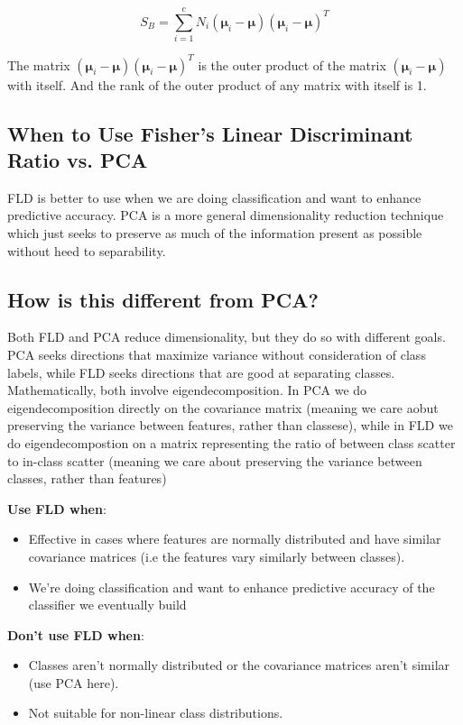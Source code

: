 \documentclass[12pt]{article}
\begin{document}
\[S_B = \sum_{i=1}^{c} N_i (\boldsymbol{\mu}_i - \boldsymbol{\mu})(\boldsymbol{\mu}_i - \boldsymbol{\mu})^T\]

The matrix \((\boldsymbol{\mu}_i - \boldsymbol{\mu})(\boldsymbol{\mu}_i - \boldsymbol{\mu})^T\) is the outer product of the matrix \((\boldsymbol{\mu}_i - \boldsymbol{\mu})\) with itself. And the rank of the outer product of any matrix with itself is 1.

\subsection{When to Use Fisher's Linear Discriminant Ratio vs. PCA}

FLD is better to use when we are doing classification and want to enhance predictive accuracy. PCA is a more general dimensionality reduction technique which just seeks to preserve as much of the information present as possible without heed to separability.

\subsection{How is this different from PCA?}
Both FLD and PCA reduce dimensionality, but they do so with different goals. PCA seeks directions that maximize variance without consideration of class labels, while FLD seeks directions that are good at separating classes. Mathematically, both involve eigendecomposition. In PCA we do eigendecomposition directly on the covariance matrix (meaning we care aobut preserving the variance between features, rather than classese), while in FLD we do eigendecompostion on a matrix representing the ratio of between class scatter to in-class scatter (meaning we care about preserving  the variance between classes, rather than features)

\textbf{Use FLD when}:
\begin{itemize}
    \item Effective in cases where features are normally distributed and have similar covariance matrices (i.e the features vary similarly between classes).
    \item We're doing classification and want to enhance predictive accuracy of the classifier we eventually build
\end{itemize}

\textbf{Don't use FLD when}:
\begin{itemize}
    \item Classes aren't normally distributed or the covariance matrices aren't similar (use PCA here).
    \item Not suitable for non-linear class distributions.
\end{itemize}
\end{document}
